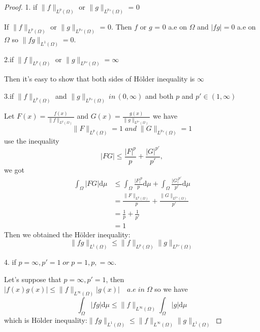\documentclass{article}
\begin{document}
\begin{proof}
1. if $\|f\|_{L^p(\Omega)} $ or $\|g\|_{L^p{'}(\Omega)} $ = 0

 If $\|f\|_{L^p(\Omega)} $ or $\|g\|_{L^p{'}(\Omega)} $ = 0. Then $f$ or $g$ = 0 a.e on $\Omega$ and $|fg| = 0$ a.e on $\Omega$ so $\|fg\|_{L^1(\Omega)} = 0.$
 
 2.if $\|f\|_{L^p(\Omega)} $ or $\|g\|_{L^p{'}(\Omega)} = \infty $ 
 
 Then it's easy to show that both sides of H\"older inequality is $\infty$
 
 3.if $\|f\|_{L^p(\Omega)} $ and $\|g\|_{L^p{
'}(\Omega)} \, in \, (0,\infty) $ and both $p$ and $p' \in (1,\infty) $
 
Let $F(x) = \frac{f(x)}{\|f\|_{L^p(\Omega)}}$  and $G(x) = \frac{g(x)}{\|g\|_{L^p{'}(\Omega)}}$
 we have $$\|F\|_{L^p(\Omega)} = 1 \; and\; \|G\|_{L^p{'}(\Omega)} = 1$$
 use the inequality $$|FG| \leq \frac{|F|^p}{p} + \frac{|G|^{p'}}{p'}  ,$$
 we got 
 \begin{equation*}
 \begin{split}
\int_{\Omega}|FG|\mathrm{d}\mu &\leq \int_{\Omega}\frac{|F|^p}{p}\mathrm{d}\mu + \int_{\Omega}\frac{|G|^{p'}}{p'}\mathrm{d}\mu \\
& = \frac{\|F\|_{L^p(\Omega)}}{p}+\frac{\|G\|_{L^p{'}(\Omega)}}{p'}\\
& = \frac{1}{p} + \frac{1}{p'}\\
& = 1
\end{split}
 \end{equation*}
 Then we obtained the H\"older inequality:$$\|fg\|_{L^1(\Omega)} \leq \|f\|_{L^p(\Omega)} \|g\|_{L^p{'}(\Omega)}$$
 
 4. if $p = \infty,p' = 1 \;or\; p = 1,p, = \infty.$
 
 Let's suppose that $p = \infty,p' = 1 $, then $|f(x)g(x)| \leq \|f\|_{L^{\infty}(\Omega)}|g(x)| \quad a.e \; in \; \Omega$ 
 so we have 
 $$\int_{\Omega}|fg|\mathrm{d}\mu \leq \|f\|_{L^{\infty}(\Omega)}\int_{\Omega}|g|\mathrm{d}\mu$$
 which is H\"older inequality:$\|fg\|_{L^1(\Omega)} \leq \|f\|_{L^{\infty}(\Omega)} \|g\|_{L^1(\Omega)}$
\end{proof}
\end{document}

